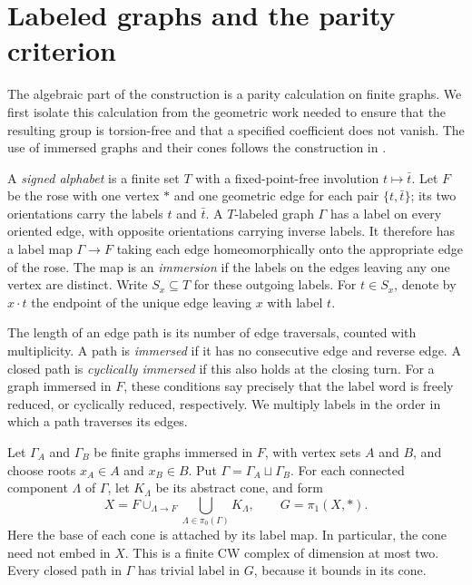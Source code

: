 \section{Labeled graphs and the parity criterion}\label{sec:algebra}

The algebraic part of the construction is a parity calculation on finite
graphs.  We first isolate this calculation from the geometric work needed
to ensure that the resulting group is torsion-free and that a specified
coefficient does not vanish.  The use of immersed graphs and their cones
follows the construction in \cite[Proposition~5.1 and Section~6]{OpenAI2026ZD}.

A \emph{signed alphabet} is a finite set $T$ with a fixed-point-free
involution $t\mapsto\bar t$.  Let $F$ be the rose with one vertex $*$ and
one geometric edge for each pair $\{t,\bar t\}$; its two orientations
carry the labels $t$ and $\bar t$.  A $T$-labeled graph $\Gamma$ has a
label on every oriented edge, with opposite orientations carrying inverse
labels.  It therefore has a label map $\Gamma\to F$ taking each edge
homeomorphically onto the appropriate edge of the rose.  The map is an
\emph{immersion} if the labels on the edges leaving any one vertex are
distinct.  Write $S_x\subseteq T$ for these outgoing labels.  For $t\in
S_x$, denote by $x\cdot t$ the endpoint of the unique edge leaving $x$
with label $t$.

The length of an edge path is its number of edge traversals, counted with
multiplicity.  A path is \emph{immersed} if it has no consecutive edge
and reverse edge.  A closed path is \emph{cyclically immersed} if this
also holds at the closing turn.  For a graph immersed in $F$, these
conditions say precisely that the label word is freely reduced, or
cyclically reduced, respectively.  We multiply labels in the order in
which a path traverses its edges.

Let $\Gamma_A$ and $\Gamma_B$ be finite graphs immersed in $F$, with
vertex sets $A$ and $B$, and choose roots $x_A\in A$ and $x_B\in B$.
Put $\Gamma=\Gamma_A\sqcup\Gamma_B$.  For each connected component
$\Lambda$ of $\Gamma$, let $K_\Lambda$ be its abstract cone, and form
\begin{equation}\label{eq:cone-complex}
 X=F\mathop{\cup}_{\Lambda\to F}
       \bigcup_{\Lambda\in\pi_0(\Gamma)}K_\Lambda,
 \qquad G=\pi_1(X,*).
\end{equation}
Here the base of each cone is attached by its label map.  In particular,
the cone need not embed in $X$.  This is a finite CW complex of dimension
at most two.  Every closed path in $\Gamma$ has trivial label in $G$,
because it bounds in its cone.

